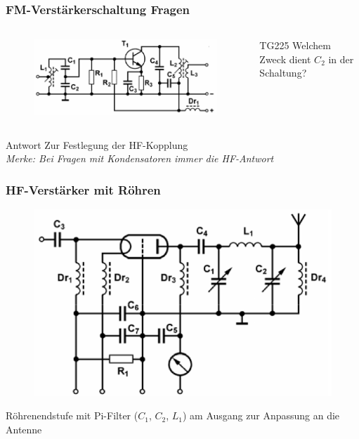\begin{frame}
  \frametitle{FM-Verstärkerschaltung Fragen}
  \begin{columns}
    \begin{figure}
      \includegraphics[width=1\textwidth,height=.5\textheight,keepaspectratio]{a07/TG222.png}
    \end{figure}
    \begin{center}
      \begin{exampleblock}{TG225}
        Welchem Zweck dient $C_2$ in der Schaltung?
      \end{exampleblock}
    \end{center}
  \end{columns}
  \pause
  \begin{exampleblock}{Antwort}
    Zur Festlegung der HF-Kopplung \\
    \emph{Merke: Bei Fragen mit Kondensatoren immer die HF-Antwort}
  \end{exampleblock}
\end{frame}

\begin{frame}
  \frametitle{HF-Verstärker mit Röhren}

  \begin{center}
    \begin{figure}
      \includegraphics[width=1\textwidth,height=.55\textheight,keepaspectratio]{a07/TG313.png}
    \end{figure}
  \end{center}
  Röhrenendstufe mit Pi-Filter ($C_1$, $C_2$, $L_1$) am Ausgang zur Anpassung an die Antenne
\end{frame}

